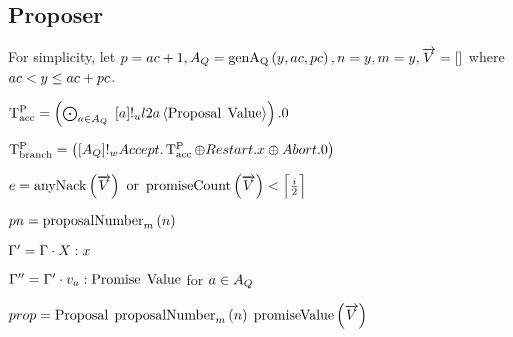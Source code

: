 \subsection{Proposer}
For simplicity, let $\ProposerIndex = \AcceptorCount + 1, \AQ = \genAq{y}{\AcceptorCount}{\ProposerCount}, n = y, m = y, \VectorV = []$ where $\AcceptorCount < y \leq \AcceptorCount + \ProposerCount$.

$\TpAccept = \DotForall{\AcceptorIndex\in\AQ}{\SendUnreliableL{\AcceptorIndex}{\LTwoA}{\Proposal{\Value}}}.\End$

$\TpBranch = \SendWeaklyL{\AQ}{\Accept . \TpAccept \oplus \Restart . x \oplus \Abort .\End}$

$e = \anyNack{\VectorV} \tOr \promiseCount{\VectorV} < \ceil{\frac{i}{2}}$

$pn = \proposalNumber{n}{m}$

$\Gamma'=\Gamma\cdot\GEnvEntry{X}{x}$

$\Gamma'' = \Gamma' \cdot \GEnvEntry{v_{\AcceptorIndex}}{\Promise{\Value}}$ for $\AcceptorIndex\in\AQ$

$prop = \ProposalC{\proposalNumber{n}{m}}{\promiseValue{\VectorV}}$

